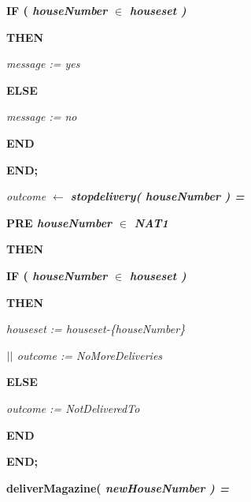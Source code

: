 \documentclass[11pt]{article}
\begin{document}
\begin{sloppypar}
\hspace*{0.80in}\bf IF \rm ( \it houseNumber  $\in$  \it houseset \rm )

\hspace*{0.80in}\bf THEN

\hspace*{1.00in}\it message \rm := \it yes

\hspace*{0.80in}\bf ELSE 

\hspace*{1.00in}\it message \rm := \it no\hspace*{0.10in}

\hspace*{0.80in}\bf END\hspace*{0.50in}

\hspace*{0.60in}\bf END\rm ;

\hspace*{0.20in}

\hspace*{0.40in}\hspace*{0.40in}\it outcome  $\leftarrow$  \bf stopdelivery\rm ( \it houseNumber \rm ) \rm =

\hspace*{0.60in}\bf PRE \it houseNumber  $\in$  \bf NAT1 

\hspace*{0.60in}\bf THEN

\hspace*{0.80in}\bf IF \rm ( \it houseNumber  $\in$  \it houseset \rm )

\hspace*{1.20in}\bf THEN

\hspace*{1.40in}\it houseset \rm := \it houseset\rm -\rm \{\it houseNumber\rm \}

\hspace*{1.40in} $\mbox{$\mid\mid$}$  \it outcome \rm := \it NoMoreDeliveries

\hspace*{1.20in}\bf ELSE

\hspace*{1.40in}\it outcome \rm := \it NotDeliveredTo

\hspace*{1.20in}\bf END

\hspace*{0.60in}\bf END\rm ;

\vspace*{4mm}
\hspace*{0.40in}\bf deliverMagazine\rm ( \it newHouseNumber \rm ) \rm =


\end{sloppypar}
\end{document}
